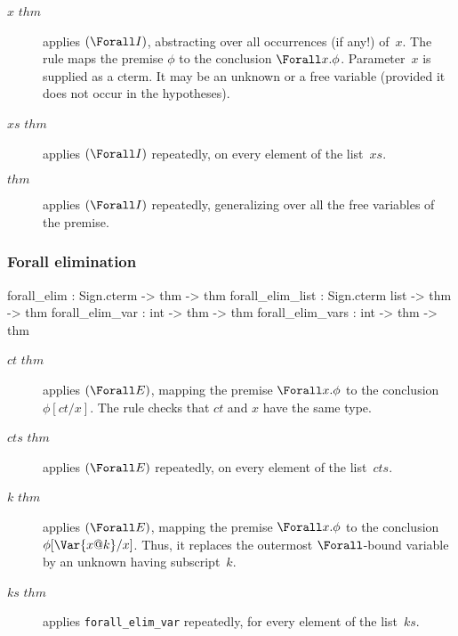 \begin{description}
\item[ $x$ $thm$] 
applies $({\Forall}I)$, abstracting over all occurrences (if any!) of~$x$.
The rule maps the premise $\phi$ to the conclusion $\Forall x.\phi$.
Parameter~$x$ is supplied as a cterm.  It may be an unknown or a free
variable (provided it does not occur in the hypotheses).

\item[ $xs$ $thm$] 
applies $({\Forall}I)$ repeatedly, on every element of the list~$xs$.

\item[ $thm$] 
applies $({\Forall}I)$ repeatedly, generalizing over all the free variables
of the premise.
\end{description}


\subsubsection{Forall elimination}
\begin{ttbox} 
forall_elim       : Sign.cterm      -> thm -> thm
forall_elim_list  : Sign.cterm list -> thm -> thm
forall_elim_var   :             int -> thm -> thm
forall_elim_vars  :             int -> thm -> thm
\end{ttbox}

\begin{description}
\item[ $ct$ $thm$] 
applies $({\Forall}E)$, mapping the premise $\Forall x.\phi$ to the conclusion
$\phi[ct/x]$.  The rule checks that $ct$ and $x$ have the same type.

\item[ $cts$ $thm$] 
applies $({\Forall}E)$ repeatedly, on every element of the list~$cts$.

\item[ $k$ $thm$] 
applies $({\Forall}E)$, mapping the premise $\Forall x.\phi$ to the conclusion
$\phi[\Var{x@k}/x]$.  Thus, it replaces the outermost $\Forall$-bound
variable by an unknown having subscript~$k$.

\item[ $ks$ $thm$] 
applies {\tt forall_elim_var} repeatedly, for every element of the list~$ks$.
\end{description}

